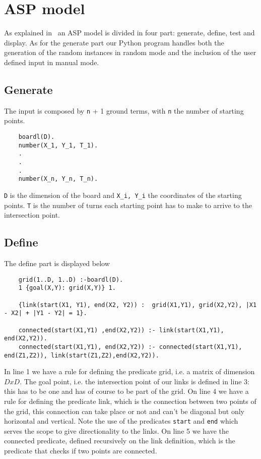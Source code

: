 \section{ASP model}
As explained in~\cite{ClingoGuide} an ASP model is divided in four part: generate, define, test and display.
As for the generate part our Python program handles both the generation of the random instances in random mode and the inclusion of the user defined input in manual mode.
\subsection{Generate}
The input is composed by \texttt{n} + 1 ground terms, with \texttt{n} the number of starting points.
\begin{verbatim}
    boardl(D).
    number(X_1, Y_1, T_1).
    .
    .
    .
    number(X_n, Y_n, T_n).
\end{verbatim}
\texttt{D} is the dimension of the board and \texttt{X_i, Y_i} the coordinates of the starting points. \texttt{T} is the number of turns each starting point has to make to arrive to the intersection point.

\subsection{Define}
The define part is displayed below
\begin{verbatim}
    grid(1..D, 1..D) :-boardl(D).
    1 {goal(X,Y): grid(X,Y)} 1.
    
    {link(start(X1, Y1), end(X2, Y2)) :  grid(X1,Y1), grid(X2,Y2), |X1 - X2| + |Y1 - Y2| = 1}. 
    
    connected(start(X1,Y1) ,end(X2,Y2)) :- link(start(X1,Y1), end(X2,Y2)).
    connected(start(X1,Y1), end(X2,Y2)) :- connected(start(X1,Y1), end(Z1,Z2)), link(start(Z1,Z2),end(X2,Y2)). 
\end{verbatim}

In line 1 we have a rule for defining the predicate grid, i.e. a matrix of dimension $DxD$. The goal point, i.e. the intersection point of our links is defined in line 3: this has to be one and has of course to be part of the grid.
On line 4 we have a rule for defining the predicate link, which is the connection between two points of the grid, this connection can take place or not and can't be diagonal but only horizontal and vertical. Note the use of the predicates \texttt{start} and \texttt{end} which serves the scope to give directionality to the links.
On line 5 we have the connected predicate, defined recursively on the link definition, which is the predicate that checks if two points are connected.
